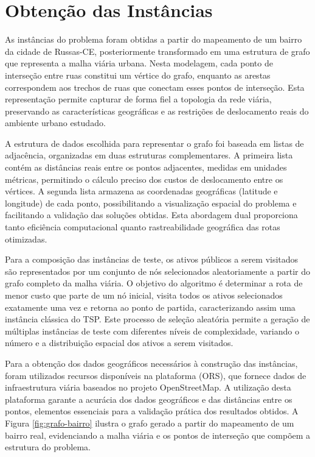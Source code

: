 \section{Obtenção das Instâncias}

As instâncias do problema foram obtidas a partir do mapeamento de um bairro da cidade de Russas-CE, 
posteriormente transformado em uma estrutura de grafo que representa a malha viária urbana. Nesta 
modelagem, cada ponto de interseção entre ruas constitui um vértice do grafo, enquanto as arestas 
correspondem aos trechos de ruas que conectam esses pontos de interseção. Esta representação 
permite capturar de forma fiel a topologia da rede viária, preservando as características 
geográficas e as restrições de deslocamento reais do ambiente urbano estudado.

A estrutura de dados escolhida para representar o grafo foi baseada em listas de adjacência, 
organizadas em duas estruturas complementares. A primeira lista contém as distâncias reais entre 
os pontos adjacentes, medidas em unidades métricas, permitindo o cálculo preciso dos custos de 
deslocamento entre os vértices. A segunda lista armazena as coordenadas geográficas (latitude e 
longitude) de cada ponto, possibilitando a visualização espacial do problema e facilitando a 
validação das soluções obtidas. Esta abordagem dual proporciona tanto eficiência computacional 
quanto rastreabilidade geográfica das rotas otimizadas.

Para a composição das instâncias de teste, os ativos públicos a serem visitados são representados 
por um conjunto de nós selecionados aleatoriamente a partir do grafo completo da malha viária. 
O objetivo do algoritmo é determinar a rota de menor custo que parte de um nó inicial, visita 
todos os ativos selecionados exatamente uma vez e retorna ao ponto de partida, caracterizando 
assim uma instância clássica do \gls{TSP}. Este processo de seleção aleatória permite a geração 
de múltiplas instâncias de teste com diferentes níveis de complexidade, variando o número e a 
distribuição espacial dos ativos a serem visitados.

Para a obtenção dos dados geográficos necessários à construção das instâncias, foram utilizados 
recursos disponíveis na plataforma (\gls{ORS}), que fornece dados de infraestrutura 
viária baseados no projeto OpenStreetMap. A utilização desta plataforma garante a acurácia dos 
dados geográficos e das distâncias entre os pontos, elementos essenciais para a validação prática 
dos resultados obtidos. A Figura \ref{fig:grafo-bairro} ilustra o grafo gerado a partir do 
mapeamento de um bairro real, evidenciando a malha viária e os pontos de interseção que compõem 
a estrutura do problema.

